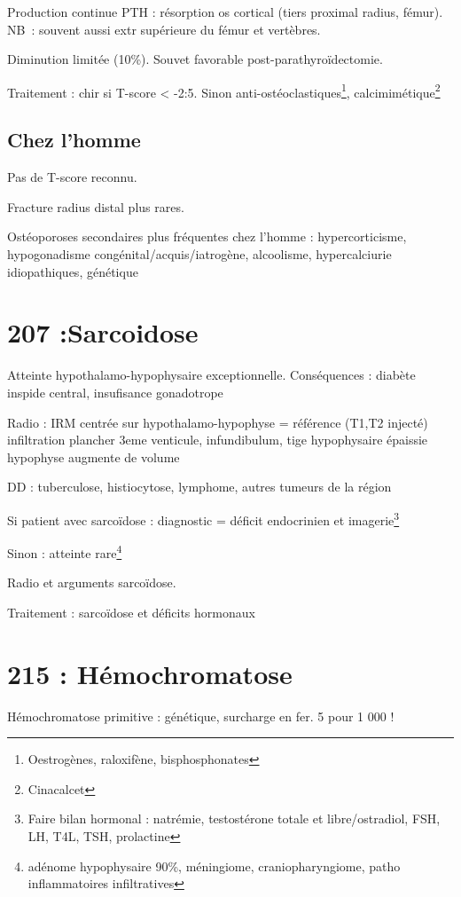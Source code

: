 \documentclass[11pt]{article}
\begin{document}
Production continue PTH : \inc résorption os cortical (tiers proximal radius,
fémur). NB : souvent aussi extr supérieure du fémur et vertèbres. 

Diminution limitée (10\%). Souvet favorable post-parathyroïdectomie.

Traitement : chir si T-score < -2:5. Sinon anti-ostéoclastiques\footnote{Oestrogènes, raloxifène, bisphosphonates}, calcimimétique\footnote{Cinacalcet}

\subsection{Chez l'homme}
\label{sec:org5b148ef}
Pas de T-score reconnu. 

Fracture radius distal plus rares.

Ostéoporoses secondaires plus fréquentes chez l'homme : hypercorticisme,
hypogonadisme congénital/acquis/iatrogène, alcoolisme, hypercalciurie
idiopathiques, génétique
\section{207 :Sarcoidose}
\label{sec:org3153b1f}
Atteinte hypothalamo-hypophysaire exceptionnelle. Conséquences : diabète
inspide central, insufisance gonadotrope

Radio : IRM centrée sur hypothalamo-hypophyse = référence (T1,T2 injecté) \thus
infiltration plancher 3eme venticule, infundibulum, tige hypophysaire épaissie
\textpm{} hypophyse augmente de volume

DD : tuberculose, histiocytose, lymphome, autres tumeurs de la région 

Si patient avec sarcoïdose : diagnostic = déficit endocrinien et imagerie\footnote{Faire bilan hormonal : natrémie, testostérone totale et libre/ostradiol,
FSH, LH, T4L, TSH, prolactine}

Sinon : atteinte rare\footnote{adénome hypophysaire 90\%, méningiome, craniopharyngiome, patho
inflammatoires infiltratives}

Radio et arguments sarcoïdose.

Traitement : sarcoïdose et déficits hormonaux

\section{215 : Hémochromatose}
\label{sec:org1ea2b31}
Hémochromatose primitive : génétique, surcharge en fer. 5 pour 1 000 !
\end{document}
